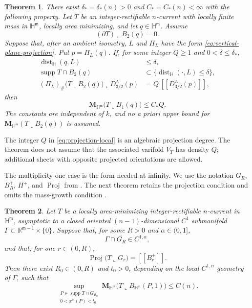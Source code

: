 \documentclass[11pt,reqno]{amsart}
\numberwithin{equation}{section}
\newtheorem{theorem}{Theorem}[section]
\theoremstyle{definition}
\theoremstyle{remark}
\newcommand{\Hyp}{\mathbb H}
\newcommand{\R}{\mathbb R}
\newcommand{\Mass}{\mathbf M}
\newcommand{\supp}{\operatorname{supp}}
\newcommand{\dist}{\operatorname{dist}}
\newcommand{\Proj}{\operatorname{Proj}}
\newcommand{\restr}{\mathbin{\llcorner}}
\newcommand{\cur}[1]{\left[\!\left[#1\right]\!\right]}
\begin{document}
\begin{theorem}
\label{thm:local-mass}
There exist $\delta_*=\delta_*(n)>0$ and $C_*=C_*(n)<\infty$ with the
following property.  Let $T$ be an integer-rectifiable $n$-current with
locally finite mass in $\Hyp^{\mathfrak m}$, locally area minimizing, and let
$q\in\Hyp^{\mathfrak m}$.  Assume
\begin{equation}\label{eq:no-boundary-local}
 (\partial T)\restr B_2(q)=0.
\end{equation}
Suppose that, after an ambient isometry, $L$ and $\Pi_L$ have the form
\eqref{eq:vertical-plane-projection}.  Put $p=\Pi_L(q)$.  If, for some
integer $Q\ge1$ and $0<\delta\le\delta_*$,
\begin{align}
 \dist_{\Hyp}(q,L)&\le\delta,\label{eq:center-local}\\
 \supp T\cap B_2(q)&\subset
 \{\dist_{\Hyp}(\cdot,L)\le\delta\},\label{eq:tube-local}\\
 (\Pi_L)_\#\bigl(T\restr B_2(q)\bigr)\restr D_{3/2}^L(p)
 &=Q\,\cur{D_{3/2}^L(p)},\label{eq:projection-local}
\end{align}
then
\begin{equation}\label{eq:mass-local}
 \Mass_{\Hyp^{\mathfrak m}}\bigl(T\restr B_1(q)\bigr)\le C_*Q.
\end{equation}
The constants are independent of $k$, and no a priori upper bound for
$\Mass_{\Hyp^{\mathfrak m}}(T\restr B_2(q))$ is assumed.
\end{theorem}

The integer $Q$ in \eqref{eq:projection-local} is an algebraic projection
degree.  The theorem does not assume that the associated varifold $V_T$ has
density $Q$; additional sheets with opposite projected orientations are
allowed.

The multiplicity-one case is the form needed at infinity.  We use the
notation $G_R$, $B_R^+$, $H^+$, and $\Proj$ from
\cite[Section~1]{JiangXie}.  The next theorem retains the projection condition
\cite[(1.9)]{JiangXie} and omits the mass-growth condition
\cite[(1.10)]{JiangXie}.

\begin{theorem}
\label{thm:remove-growth}
Let $T$ be a locally area-minimizing integer-rectifiable $n$-current in
$\Hyp^{\mathfrak m}$, asymptotic to a closed oriented
$(n-1)$-dimensional $C^1$ submanifold
$\Gamma\subset\R^{\mathfrak m-1}\times\{0\}$.  Suppose that, for some
$R>0$ and $\alpha\in(0,1]$,
\[
 \Gamma\cap\overline{G_R}\in C^{1,\alpha},
\]
and that, for one $r\in(0,R)$,
\begin{equation}\label{eq:boundary-projection}
 \Proj\bigl(T\restr G_r\bigr)=\cur{B_r^+}.
\end{equation}
Then there exist $R_0\in(0,R)$ and $t_0>0$,
depending on the local $C^{1,\alpha}$ geometry of $\Gamma$, such that
\begin{equation}\label{eq:uniform-at-infinity}
 \sup_{\substack{P\in\supp T\cap G_{R_0}\\0<x^{\mathfrak m}(P)<t_0}}
 \Mass_{\Hyp^{\mathfrak m}}
 \bigl(T\restr B_{\Hyp^{\mathfrak m}}(P,1)\bigr)
 \le C(n).
\end{equation}
\end{theorem}
\end{document}
